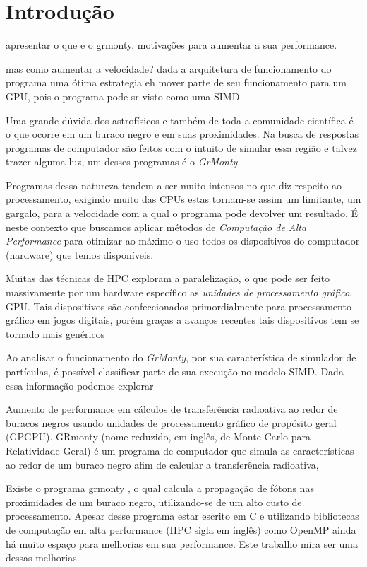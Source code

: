 \chapter{Introdução}
\label{cap:introducao}

apresentar o que e o grmonty, motivações para aumentar a sua performance.

mas como aumentar a velocidade? dada a arquitetura de funcionamento do programa uma ótima estrategia eh mover parte de seu funcionamento para um GPU, pois o programa pode sr visto como uma SIMD

Uma grande dúvida dos astrofísicos e também de toda a comunidade científica é o que ocorre em um buraco negro e em suas proximidades. Na busca de respostas programas de computador são feitos com o intuito de simular essa região e talvez trazer alguma luz, um desses programas é o \emph{GrMonty}.

Programas dessa natureza tendem a ser muito intensos no que diz respeito ao processamento, exigindo muito das CPUs estas tornam-se assim um limitante, um gargalo, para a velocidade com a qual o programa pode devolver um resultado. É neste contexto que buscamos aplicar métodos de \emph{Computação de Alta Performance} para otimizar ao máximo o uso todos os dispositivos do computador (hardware) que temos disponíveis.

Muitas das técnicas de HPC exploram a paralelização, o que pode ser feito massivamente por um hardware específico as \emph{unidades de processamento gráfico}, GPU. Tais dispositivos são confeccionados primordialmente para processamento gráfico em jogos digitais, porém graças a avanços recentes tais dispositivos tem se tornado mais genéricos

Ao analisar o funcionamento do \emph{GrMonty}, por sua característica de simulador de partículas, é possível classificar parte de sua execução no modelo SIMD. Dada essa informação podemos explorar


Aumento de performance em cálculos de transferência radioativa ao redor de
buracos negros usando unidades de processamento gráfico de propósito geral
(GPGPU).
GRmonty (nome reduzido, em inglês, de Monte Carlo para Relatividade Geral) é um programa de computador que simula as características ao redor de um buraco negro afim de calcular a transferência radioativa,


Existe o programa grmonty \citep{Dolence:09},
o qual calcula a propagação de fótons nas proximidades de um buraco negro,
utilizando-se de um alto custo de processamento. Apesar desse programa estar
escrito em C e utilizando bibliotecas de computação em alta performance
(HPC sigla em inglês) como OpenMP ainda há muito espaço para melhorias em sua
performance. Este trabalho mira ser uma dessas melhorias.

